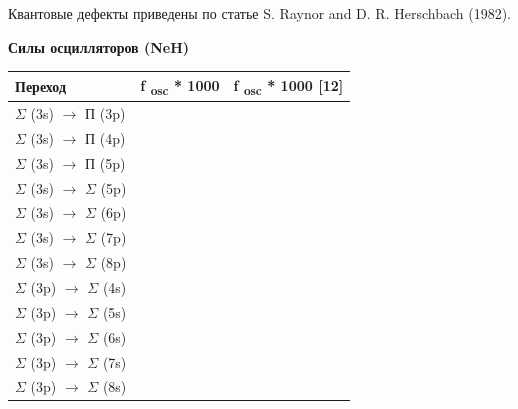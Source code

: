 Квантовые дефекты приведены по
статье \foreignlanguage{english}{S}. \foreignlanguage{english}{Raynor}
\foreignlanguage{english}{and} \foreignlanguage{english}{D}. \foreignlanguage{english}{R}.
\foreignlanguage{english}{Herschbach} (1982).


\bigskip

{\centering
\textbf{Силы
осцилляторов
(}\foreignlanguage{english}{\textbf{NeH}}\textbf{)}
\par}

\begin{flushleft}
\tablefirsthead{}
\tablehead{}
\tabletail{}
\tablelasttail{}
\begin{supertabular}{|m{2.4360003cm}|m{2.3630004cm}|m{2.584cm}|}
\hline
\textbf{{Переход}} &
\textbf{{f }}\textbf{{\textsubscript{osc }}}\textbf{{* 1000}} &
\textbf{{f }}\textbf{{\textsubscript{osc}}}\textbf{{ * 1000
[}}\foreignlanguage{english}{\textbf{{12}}}\textbf{{]}}\\\hline
{$\Sigma $ (3s) $\rightarrow $ П (3p)} &
 &
\raggedleft{}\\
{$\Sigma $ (3s) $\rightarrow $ П (4p)} &
 &
\raggedleft{}\\
{$\Sigma $ (3s) $\rightarrow $ П (5p)} &
 &
\raggedleft{}\\\hline
{$\Sigma $ (3s) $\rightarrow $ $\Sigma $ (5p)} &
 &
\raggedleft{}\\
{$\Sigma $ (3s) $\rightarrow $ $\Sigma $ (6p)} &
 &
\raggedleft{}\\
{$\Sigma $ (3s) $\rightarrow $ $\Sigma $ (7p)} &
 &
\raggedleft{}\\
{$\Sigma $ (3s) $\rightarrow $ $\Sigma $ (8p)} &
 &
\raggedleft{}\\\hline
{$\Sigma $ (3p) $\rightarrow $ $\Sigma $ (4s)} &
 &
\raggedleft{}\\
{$\Sigma $ (3p) $\rightarrow $ $\Sigma $ (5s)} &
 &
\raggedleft{}\\
{$\Sigma $ (3p) $\rightarrow $ $\Sigma $ (6s)} &
 &
\raggedleft{}\\
{$\Sigma $ (3p) $\rightarrow $ $\Sigma $ (7s)} &
 &
\raggedleft{}\\
{$\Sigma $ (3p) $\rightarrow $ $\Sigma $ (8s)} &

\end{supertabular}
\end{flushleft}
